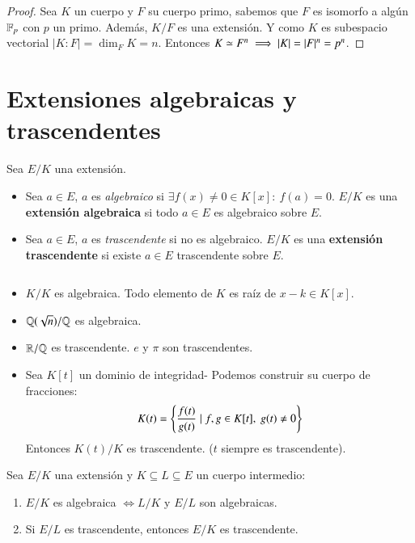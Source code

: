 \begin{proof}
    Sea $K$ un cuerpo y $F$ su cuerpo primo, sabemos que $F$ es isomorfo a algún $\mathbb{F}_p$ con $p$ un primo. Además, $K/F$ es una extensión. Y como $K$ es subespacio vectorial $|K:F| = \dim_F K = n$. Entonces $K \simeq F^n \implies |K| = |F|^n = p^n$.
\end{proof}

\section{Extensiones algebraicas y trascendentes}

\begin{dfn}
    Sea $E/K$ una extensión.
    \begin{itemize}
        \item Sea $a \in E$, $a$ es \textit{algebraico} si $\exists f(x) \neq 0 \in K[x]:\ f(a) = 0$. $E/K$ es una \textbf{extensión algebraica} si todo $a \in E$ es algebraico sobre $E$.
        \item Sea $a \in E$, $a$ es \textit{trascendente} si no es algebraico. $E/K$ es una \textbf{extensión trascendente} si existe $a \in E$ trascendente sobre $E$.
    \end{itemize}
\end{dfn}

\begin{eg}$ $
    \begin{itemize}
        \item $K/K$ es algebraica. Todo elemento de $K$ es raíz de $x - k \in K[x]$.
        \item $\mathbb{Q}(\sqrt{n})/\mathbb{Q}$ es algebraica.
        \item $\mathbb{R}/\mathbb{Q}$ es trascendente. $e$ y $\pi$ son trascendentes.
        \item Sea $K[t]$ un dominio de integridad- Podemos construir su cuerpo de fracciones:
        $$
            K(t) = \left\{\frac{f(t)}{g(t)} \mid f,g \in K[t],\ g(t) \neq 0\right\}
        $$
        Entonces $K(t)/K$ es trascendente. ($t$ siempre es trascendente).
    \end{itemize}
\end{eg}

\begin{pro}
    Sea $E/K$ una extensión y $K \subseteq L\subseteq E$ un cuerpo intermedio:
    \begin{enumerate}
        \item $E/K$ es algebraica $\iff L/K$ y $E/L$ son algebraicas.
        \item Si $E/L$ es trascendente, entonces $E/K$ es trascendente.
    \end{enumerate}
\end{pro}

